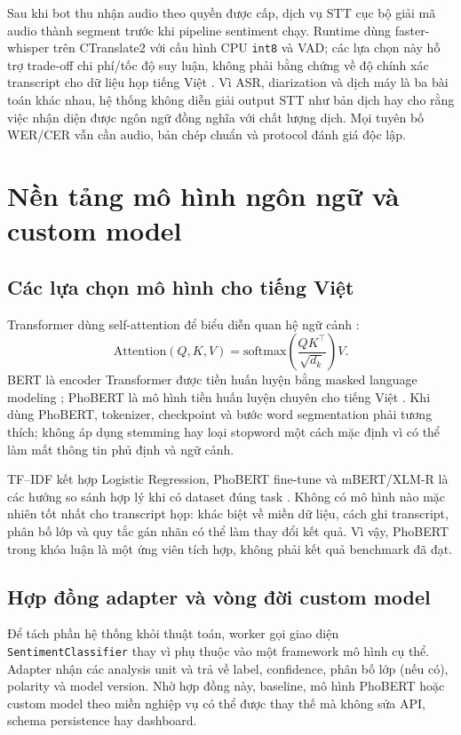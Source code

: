 Sau khi bot thu nhận audio theo quyền được cấp, dịch vụ STT cục bộ giải mã audio thành segment trước khi pipeline sentiment chạy. Runtime dùng faster-whisper trên CTranslate2 với cấu hình CPU \texttt{int8} và VAD; các lựa chọn này hỗ trợ trade-off chi phí/tốc độ suy luận, không phải bằng chứng về độ chính xác transcript cho dữ liệu họp tiếng Việt \cite{fasterwhisper2026}. Vì ASR, diarization và dịch máy là ba bài toán khác nhau, hệ thống không diễn giải output STT như bản dịch hay cho rằng việc nhận diện được ngôn ngữ đồng nghĩa với chất lượng dịch. Mọi tuyên bố WER/CER vẫn cần audio, bản chép chuẩn và protocol đánh giá độc lập.

\section{Nền tảng mô hình ngôn ngữ và custom model}
\subsection{Các lựa chọn mô hình cho tiếng Việt}
Transformer dùng self-attention để biểu diễn quan hệ ngữ cảnh \cite{vaswani2017}:
\begin{equation}
\mathrm{Attention}(Q,K,V)=\mathrm{softmax}\left(\frac{QK^\top}{\sqrt{d_k}}\right)V.
\end{equation}
BERT là encoder Transformer được tiền huấn luyện bằng masked language modeling \cite{devlin2019}; PhoBERT là mô hình tiền huấn luyện chuyên cho tiếng Việt \cite{phobert2020}. Khi dùng PhoBERT, tokenizer, checkpoint và bước word segmentation phải tương thích; không áp dụng stemming hay loại stopword một cách mặc định vì có thể làm mất thông tin phủ định và ngữ cảnh.

TF--IDF kết hợp Logistic Regression, PhoBERT fine-tune và mBERT/XLM-R là các hướng so sánh hợp lý khi có dataset đúng task \cite{xlmr2020}. Không có mô hình nào mặc nhiên tốt nhất cho transcript họp: khác biệt về miền dữ liệu, cách ghi transcript, phân bố lớp và quy tắc gán nhãn có thể làm thay đổi kết quả. Vì vậy, PhoBERT trong khóa luận là một ứng viên tích hợp, không phải kết quả benchmark đã đạt.

\subsection{Hợp đồng adapter và vòng đời custom model}
Để tách phần hệ thống khỏi thuật toán, worker gọi giao diện \texttt{SentimentClassifier} thay vì phụ thuộc vào một framework mô hình cụ thể. Adapter nhận các analysis unit và trả về label, confidence, phân bố lớp (nếu có), polarity và model version. Nhờ hợp đồng này, baseline, mô hình PhoBERT hoặc custom model theo miền nghiệp vụ có thể được thay thế mà không sửa API, schema persistence hay dashboard.

